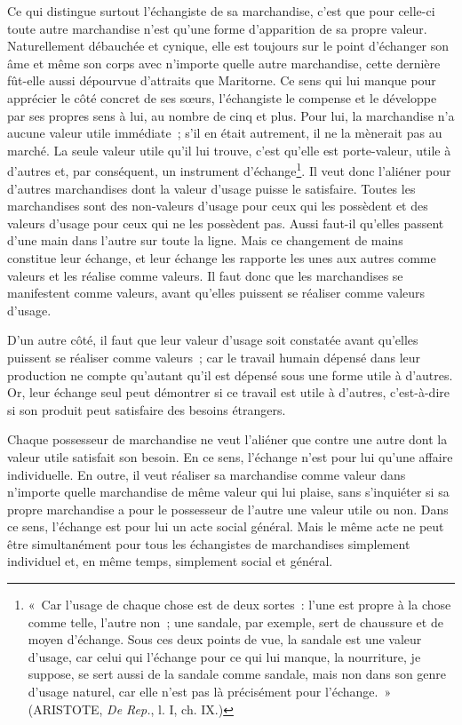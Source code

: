\documentclass[french,twoside]{book} %
\begin{document}
Ce qui distingue surtout l’échangiste de sa marchandise, c’est que pour celle-ci toute autre marchandise n’est qu’une forme d’apparition de sa propre valeur. Naturellement débauchée et cynique, elle est toujours sur le point d’échanger son âme et même son corps avec n’importe quelle autre marchandise, cette dernière fût-elle aussi dépourvue d’attraits que Maritorne. Ce sens qui lui manque pour apprécier le côté concret de ses sœurs, l’échangiste le compense et le développe par ses propres sens à lui, au nombre de cinq et plus. Pour lui, la marchandise n’a aucune valeur utile immédiate ; s’il en était autrement, il ne la mènerait pas au marché. La seule valeur utile qu’il lui trouve, c’est qu’elle est porte-valeur, utile à d’autres et, par conséquent, un instrument d’échange\footnote{« Car l’usage de chaque chose est de deux sortes : l’une est propre à la chose comme telle, l’autre non ; une sandale, par exemple, sert de chaussure et de moyen d’échange. Sous ces deux points de vue, la sandale est une valeur d’usage, car celui qui l’échange pour ce qui lui manque, la nourriture, je suppose, se sert aussi de la sandale comme sandale, mais non dans son genre d’usage naturel, car elle n’est pas là précisément pour l’échange. » (ARISTOTE, \emph{De Rep.}, l. I, ch. IX.)}. Il veut donc l’aliéner pour d’autres marchandises dont la valeur d’usage puisse le satisfaire. Toutes les marchandises sont des non-valeurs d’usage pour ceux qui les possèdent et des valeurs d’usage pour ceux qui ne les possèdent pas. Aussi faut-il qu’elles passent d’une main dans l’autre sur toute la ligne. Mais ce changement de mains constitue leur échange, et leur échange les rapporte les unes aux autres comme valeurs et les réalise comme valeurs. Il faut donc que les marchandises se manifestent comme valeurs, avant qu’elles puissent se réaliser comme valeurs d’usage.\par
D’un autre côté, il faut que leur valeur d’usage soit constatée avant qu’elles puissent se réaliser comme valeurs ; car le travail humain dépensé dans leur production ne compte qu’autant qu’il est dépensé sous une forme utile à d’autres. Or, leur échange seul peut démontrer si ce travail est utile à d’autres, c’est-à-dire si son produit peut satisfaire des besoins étrangers.\par
Chaque possesseur de marchandise ne veut l’aliéner que contre une autre dont la valeur utile satisfait son besoin. En ce sens, l’échange n’est pour lui qu’une affaire individuelle. En outre, il veut réaliser sa marchandise comme valeur dans n’importe quelle marchandise de même valeur qui lui plaise, sans s’inquiéter si sa propre marchandise a pour le possesseur de l’autre une valeur utile ou non. Dans ce sens, l’échange est pour lui un acte social général. Mais le même acte ne peut être simultanément pour tous les échangistes de marchandises simplement individuel et, en même temps, simplement social et général.\par
\end{document}
